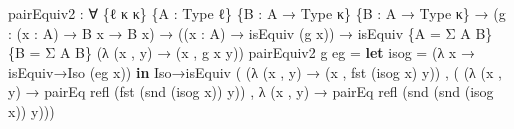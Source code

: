 \documentclass[
  11pt,
  oneside,
  article]{memoir}
\newenvironment{Shaded}{}{}
\newcommand{\KeywordTok}[1]{\textcolor[rgb]{0.00,0.44,0.13}{\textbf{#1}}}
\newcommand{\NormalTok}[1]{#1}
\newcommand{\OtherTok}[1]{\textcolor[rgb]{0.00,0.44,0.13}{#1}}
\theoremstyle{definition}
\theoremstyle{plain}
\newcommand{\0}{\textsf{0}}
\newcommand{\1}{\tn{\textsf{1}}}
\begin{document}
\begin{Shaded}
\begin{Highlighting}[]
\NormalTok{pairEquiv2 }\OtherTok{:} \OtherTok{∀} \OtherTok{\{}\NormalTok{ℓ κ κ\textquotesingle{}}\OtherTok{\}} \OtherTok{\{}\NormalTok{A }\OtherTok{:}\NormalTok{ Type ℓ}\OtherTok{\}} \OtherTok{\{}\NormalTok{B }\OtherTok{:}\NormalTok{ A }\OtherTok{→}\NormalTok{ Type κ}\OtherTok{\}} \OtherTok{\{}\NormalTok{B\textquotesingle{} }\OtherTok{:}\NormalTok{ A }\OtherTok{→}\NormalTok{ Type κ\textquotesingle{}}\OtherTok{\}}
             \OtherTok{→} \OtherTok{(}\NormalTok{g }\OtherTok{:} \OtherTok{(}\NormalTok{x }\OtherTok{:}\NormalTok{ A}\OtherTok{)} \OtherTok{→}\NormalTok{ B x }\OtherTok{→}\NormalTok{ B\textquotesingle{} x}\OtherTok{)} \OtherTok{→} \OtherTok{((}\NormalTok{x }\OtherTok{:}\NormalTok{ A}\OtherTok{)} \OtherTok{→}\NormalTok{ isEquiv }\OtherTok{(}\NormalTok{g x}\OtherTok{))}
             \OtherTok{→}\NormalTok{ isEquiv }\OtherTok{\{}\NormalTok{A }\OtherTok{=}\NormalTok{ Σ A B}\OtherTok{\}} \OtherTok{\{}\NormalTok{B }\OtherTok{=}\NormalTok{ Σ A B\textquotesingle{}}\OtherTok{\}}
                       \OtherTok{(λ} \OtherTok{(}\NormalTok{x , y}\OtherTok{)} \OtherTok{→} \OtherTok{(}\NormalTok{x , g x y}\OtherTok{))}
\NormalTok{pairEquiv2 g eg }\OtherTok{=}
    \KeywordTok{let}\NormalTok{ isog }\OtherTok{=} \OtherTok{(λ}\NormalTok{ x }\OtherTok{→}\NormalTok{ isEquiv→Iso }\OtherTok{(}\NormalTok{eg x}\OtherTok{))} 
    \KeywordTok{in}\NormalTok{ Iso→isEquiv }\OtherTok{(} \OtherTok{(λ} \OtherTok{(}\NormalTok{x , y}\OtherTok{)} \OtherTok{→} \OtherTok{(}\NormalTok{x , fst }\OtherTok{(}\NormalTok{isog x}\OtherTok{)}\NormalTok{ y}\OtherTok{))} 
\NormalTok{                   , }\OtherTok{(} \OtherTok{(λ} \OtherTok{(}\NormalTok{x , y}\OtherTok{)} \OtherTok{→} 
\NormalTok{                          pairEq refl }\OtherTok{(}\NormalTok{fst }\OtherTok{(}\NormalTok{snd }\OtherTok{(}\NormalTok{isog x}\OtherTok{))}\NormalTok{ y}\OtherTok{))} 
\NormalTok{                     , }\OtherTok{λ} \OtherTok{(}\NormalTok{x , y}\OtherTok{)} \OtherTok{→} 
\NormalTok{                         pairEq refl }\OtherTok{(}\NormalTok{snd }\OtherTok{(}\NormalTok{snd }\OtherTok{(}\NormalTok{isog x}\OtherTok{))}\NormalTok{ y}\OtherTok{)))}


\end{Highlighting}
\end{Shaded}
\end{document}
